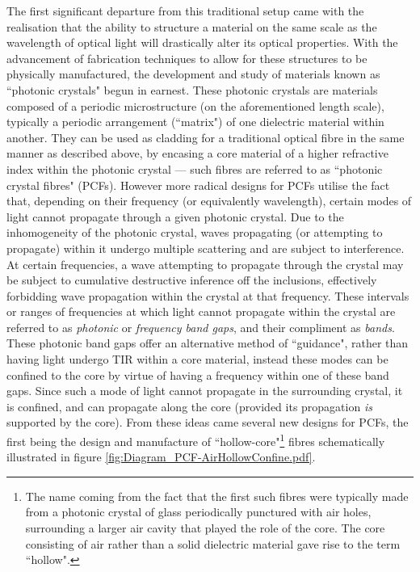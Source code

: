 The first significant departure from this traditional setup came with the realisation that the ability to 
structure a material on the same scale as the wavelength of optical light will drastically alter its optical properties.
With the advancement of fabrication techniques to allow for these structures to be physically manufactured, the development and study of materials known as ``photonic crystals" begun in earnest.
These photonic crystals are materials composed of a periodic microstructure (on the aforementioned length scale), typically a periodic arrangement (``matrix") of one dielectric material within another.
They can be used as cladding for a traditional optical fibre in the same manner as described above, by encasing a core material of a higher refractive index within the photonic crystal --- such fibres are referred to as ``photonic crystal fibres" (PCFs).
However more radical designs for PCFs utilise the fact that, depending on their frequency (or equivalently wavelength), certain modes of light cannot propagate through a given photonic crystal.
Due to the inhomogeneity of the photonic crystal, waves propagating (or attempting to propagate) within it undergo multiple scattering and are subject to interference.
At certain frequencies, a wave attempting to propagate through the crystal may be subject to cumulative destructive inference off the inclusions, effectively forbidding wave propagation within the crystal at that frequency.
These intervals or ranges of frequencies at which light cannot propagate within the crystal are referred to as \emph{photonic} or \emph{frequency band gaps}, and their compliment as \emph{bands}.
These photonic band gaps offer an alternative method of ``guidance", rather than having light undergo TIR within a core material, instead these modes can be confined to the core by virtue of having a frequency within one of these band gaps.
Since such a mode of light cannot propagate in the surrounding crystal, it is confined, and can propagate along the core (provided its propagation \emph{is} supported by the core).
From these ideas came several new designs for PCFs, the first being the design and manufacture of ``hollow-core"\footnote{The name coming from the fact that the first such fibres were typically made from a photonic crystal of glass periodically punctured with air holes, surrounding a larger air cavity that played the role of the core. The core consisting of air rather than a solid dielectric material gave rise to the term ``hollow".} fibres schematically illustrated in figure \ref{fig:Diagram_PCF-AirHollowConfine.pdf}.
